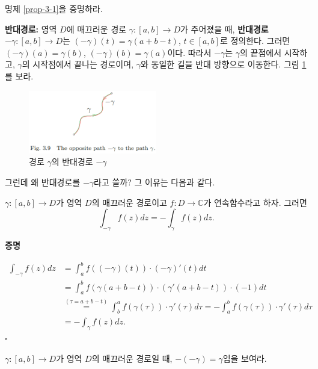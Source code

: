 \begin{salt_exercise} \label{ex-3-6}
명제 \ref{prop-3-1}을 증명하라.
\end{salt_exercise}

{\bf 반대경로:}
영역 $D$에 매끄러운 경로 $\gamma: [a,b] \to D$가 
주어졌을 때, {\bf 반대경로} $-\gamma: [a,b] \to D$는
$(-\gamma)(t) = \gamma(a+b-t)$, $t\in[a,b]$로 정의한다.
그러면 $(-\gamma)(a) = \gamma(b)$, $(-\gamma)(b) = \gamma(a)$이다.
따라서 $-\gamma$는 $\gamma$의 끝점에서 시작하고,
$\gamma$의 시작점에서 끝나는 경로이며,
$\gamma$와 동일한 길을 반대 방향으로 이동한다.
그림 \ref{fig-3-9}를 보라.
\begin{figure}[!h]
\begin{center}
\includegraphics[width=0.5\textwidth]{./SaltChapter/fig-3-9}
\end{center}
\caption{경로 $\gamma$의 반대경로 $-\gamma$}
\label{fig-3-9}
\end{figure}

그런데 왜 반대경로를 $-\gamma$라고 쓸까?
그 이유는 다음과 같다.

\begin{saltprop}{}{} \label{prop-3-2}
$\gamma: [a,b] \to D$가 영역 $D$의 매끄러운 경로이고
$f:D\to\mathbb C$가 연속함수라고 하자. 그러면
\[
\int_{-\gamma} f(z)dz = - \int_\gamma f(z)dz.
\]
\end{saltprop}

{\bf 증명}

\begin{align*}
\int_{-\gamma} f(z)dz
&= \int_a^b f((-\gamma)(t))\cdot (-\gamma)'(t)dt \\
&= \int_a^b f(\gamma(a+b-t))\cdot (\gamma'(a+b-t))\cdot(-1)dt \\
& \stackrel{(\tau=a+b-t)}=
\int_b^a f(\gamma(\tau))\cdot \gamma'(\tau)d\tau 
= - \int_a^b f(\gamma(\tau))\cdot \gamma'(\tau)d\tau \\
&= - \int_\gamma f(z)dz.
\end{align*}
\hfill $\square$

\begin{salt_exercise} \label{ex-3-7}
$\gamma: [a,b] \to D$가 영역 $D$의 매끄러운 경로일 때,
$-(-\gamma) = \gamma$임을 보여라.
\end{salt_exercise}

